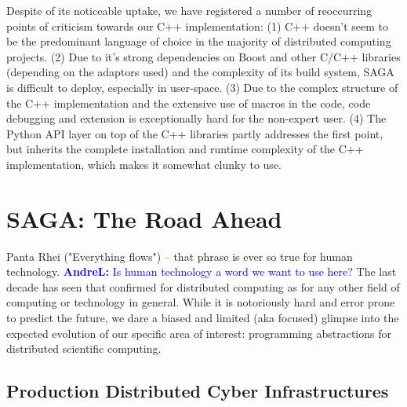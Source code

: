 \documentclass{article}
\newcommand{\B}[1]{\textbf{#1}}
\newcommand{\amnote}[1]{{\textcolor{green}{   \B{AndreM:  } #1 }}}
\newcommand{\alnote}[1]{{\textcolor{blue}{    \B{AndreL:  } #1 }}}
\newcommand{\amnote}[1]{}
\newcommand{\alnote}[1]{}
\begin{document}
   Despite of its noticeable uptake, we have registered a number of
   reoccurring points of criticism towards our C++ implementation:
   (1) C++ doesn't seem to be the predominant language of choice
   in the majority of distributed computing projects.
   (2) Due to it's strong dependencies on Boost and other C/C++
   libraries (depending on the adaptors used) and the complexity of its
   build system, SAGA is difficult to deploy, especially in user-space.
   (3) Due to the complex structure of the C++ implementation and the
   extensive use of macros in the code, code debugging and extension
   is exceptionally hard for the non-expert user.
   (4) The Python API layer on top of the C++ libraries partly
   addresses the first point, but inherits the complete installation and
   runtime complexity of the C++ implementation, which makes it somewhat
   clunky to use.




\section{SAGA: The Road Ahead}
\label{sec:road}

 Panta Rhei ("Everything flows") -- that phrase is ever so true for
 human technology.\alnote{Is human technology a word we want to use here?}  
 The last decade has seen that confirmed for
 distributed computing as for any other field of computing or
 technology in general.  While it is notoriously hard and error prone
 to predict the future, we dare a biased and limited (aka focused)
 glimpse into the expected evolution of our specific area of interest:
 programming abstractions for distributed scientific computing. 


 \subsection{Production Distributed Cyber Infrastructures}
\end{document}

